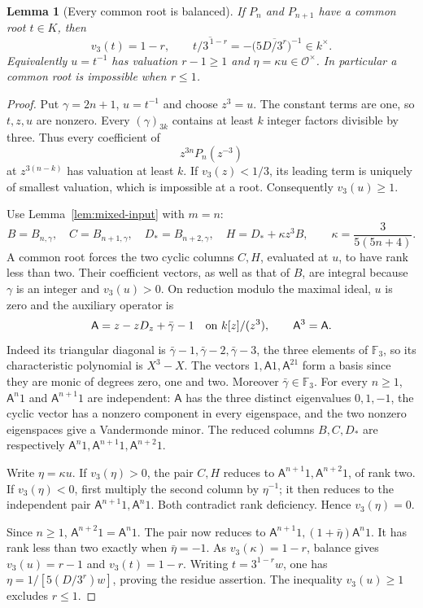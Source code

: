 \documentclass[11pt]{article}
\newtheorem{lemma}{Lemma}
\begin{document}
\begin{lemma}[Every common root is balanced]\label{lem:balance}
If $P_n$ and $P_{n+1}$ have a common root $t\in K$, then
\[
 v_3(t)=1-r,\qquad
 \overline{t/3^{\,1-r}}=-\bigl(5\overline{D/3^r}\bigr)^{-1}\in k^\times.
\]
Equivalently $u=t^{-1}$ has valuation $r-1\ge1$ and
$\eta=\kappa u\in\mathcal O^\times$.
In particular a common root is impossible when $r\le1$.
\end{lemma}
\begin{proof}
Put $\gamma=2n+1$, $u=t^{-1}$ and choose $z^3=u$.
The constant terms are one, so $t,z,u$ are nonzero.
Every $(\gamma)_{3k}$ contains at least $k$ integer factors divisible
by three. Thus every coefficient of
\[
 z^{3n}P_n(z^{-3})
\]
at $z^{3(n-k)}$ has valuation at least $k$.
If $v_3(z)<1/3$, its leading term is uniquely of smallest valuation,
which is impossible at a root. Consequently $v_3(u)\ge1$.

Use Lemma~\ref{lem:mixed-input} with $m=n$:
\[
 B=B_{n,\gamma},\quad C=B_{n+1,\gamma},\quad
 D_*=B_{n+2,\gamma},\quad
 H=D_*+\kappa z^3B,\qquad
 \kappa=\frac3{5(5n+4)}.
\]
A common root forces the two cyclic columns $C,H$, evaluated at $u$,
to have rank less than two. Their coefficient vectors, as well as
that of $B$, are integral because $\gamma$ is an integer and
$v_3(u)>0$.
On reduction modulo the maximal ideal, $u$ is zero and the auxiliary
operator is
\[
 \mathsf A=z-zD_z+\bar\gamma-1
 \quad\hbox{on }k[z]/(z^3),\qquad \mathsf A^3=\mathsf A.
\]
Indeed its triangular diagonal is
$\bar\gamma-1,\bar\gamma-2,\bar\gamma-3$, the three elements
of $\mathbb F_3$, so its characteristic polynomial is $X^3-X$.
The vectors $1,\mathsf A1,\mathsf A^21$ form a basis since they are
monic of degrees zero, one and two. Moreover $\bar\gamma\in\mathbb F_3$.
For every $n\ge1$, $\mathsf A^n1$ and $\mathsf A^{n+1}1$
are independent: $\mathsf A$ has the three distinct eigenvalues
$0,1,-1$, the cyclic vector has a nonzero component in every
eigenspace, and the two nonzero eigenspaces give a Vandermonde minor.
The reduced columns $B,C,D_*$ are respectively
$\mathsf A^n1,\mathsf A^{n+1}1,\mathsf A^{n+2}1$.

Write $\eta=\kappa u$. If $v_3(\eta)>0$, the pair $C,H$ reduces
to $\mathsf A^{n+1}1,\mathsf A^{n+2}1$, of rank two.
If $v_3(\eta)<0$, first multiply the second column by $\eta^{-1}$;
it then reduces to the independent pair
$\mathsf A^{n+1}1,\mathsf A^n1$.
Both contradict rank deficiency. Hence $v_3(\eta)=0$.

Since $n\ge1$, $\mathsf A^{n+2}1=\mathsf A^n1$.
The pair now reduces to
$\mathsf A^{n+1}1,(1+\bar\eta)\mathsf A^n1$.
It has rank less than two exactly when $\bar\eta=-1$.
As $v_3(\kappa)=1-r$, balance gives $v_3(u)=r-1$
and $v_3(t)=1-r$.
Writing $t=3^{1-r}w$, one has
$\eta=1/[5(D/3^r)w]$, proving the residue assertion.
The inequality $v_3(u)\ge1$ excludes $r\le1$.
\end{proof}
\end{document}

